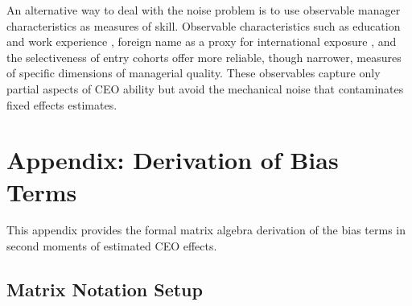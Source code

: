 \documentclass[11pt,a4paper]{article}
\begin{document}
An alternative way to deal with the noise problem is to use observable manager characteristics as measures of skill. Observable characteristics such as education and work experience \citep{DePirro2025}, foreign name as a proxy for international exposure \citep{Koren2023expat}, and the selectiveness of entry cohorts \citep{koren2024managers} offer more reliable, though narrower, measures of specific dimensions of managerial quality. These observables capture only partial aspects of CEO ability but avoid the mechanical noise that contaminates fixed effects estimates.

\clearpage
\appendix
\renewcommand{\thefigure}{A\arabic{figure}}
\renewcommand{\thetable}{A\arabic{table}}
\setcounter{figure}{0}
\setcounter{table}{0}


\section{Appendix: Derivation of Bias Terms}
This appendix provides the formal matrix algebra derivation of the bias terms in second moments of estimated CEO effects.

\subsection{Matrix Notation Setup}
\end{document}
